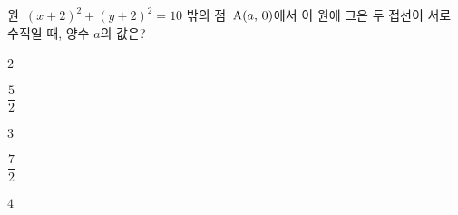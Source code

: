 원~$(x+2)^2+(y+2)^2=10$ 밖의 점~$\mathrm{A}(a,\,0)$에서 이 원에 그은 두 접선이 서로 수직일 때, 양수 $a$의 값은?
\begin{choices32}{\rule[-3ex]{0pt}{8ex}$2$}{\rule[-3ex]{0pt}{8ex}$\dfrac{5}{2}$}{\rule[-3ex]{0pt}{8ex}$3$}{\rule[-3ex]{0pt}{8ex}$\dfrac{7}{2}$}{\rule[-3ex]{0pt}{8ex}$4$}\end{choices32}
